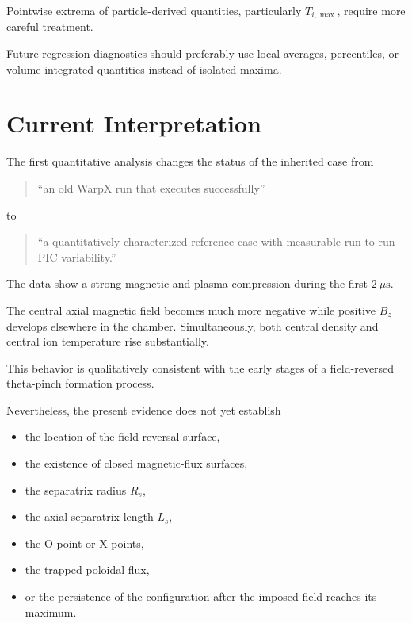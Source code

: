 \documentclass[11pt,a4paper]{article}
\begin{document}
Pointwise extrema of particle-derived quantities, particularly
\(T_{i,\max}\), require more careful treatment.

Future regression diagnostics should preferably use local averages,
percentiles, or volume-integrated quantities instead of isolated maxima.

\section{Current Interpretation}

The first quantitative analysis changes the status of the inherited case from

\begin{quote}
``an old WarpX run that executes successfully''
\end{quote}

to

\begin{quote}
``a quantitatively characterized reference case with measurable run-to-run
PIC variability.''
\end{quote}

The data show a strong magnetic and plasma compression during the first
\(2~\mu\mathrm{s}\).

The central axial magnetic field becomes much more negative while positive
\(B_z\) develops elsewhere in the chamber. Simultaneously, both central
density and central ion temperature rise substantially.

This behavior is qualitatively consistent with the early stages of a
field-reversed theta-pinch formation process.

Nevertheless, the present evidence does not yet establish

\begin{itemize}
    \item the location of the field-reversal surface,
    \item the existence of closed magnetic-flux surfaces,
    \item the separatrix radius \(R_s\),
    \item the axial separatrix length \(L_s\),
    \item the O-point or X-points,
    \item the trapped poloidal flux,
    \item or the persistence of the configuration after the imposed field
    reaches its maximum.
\end{itemize}
\end{document}
